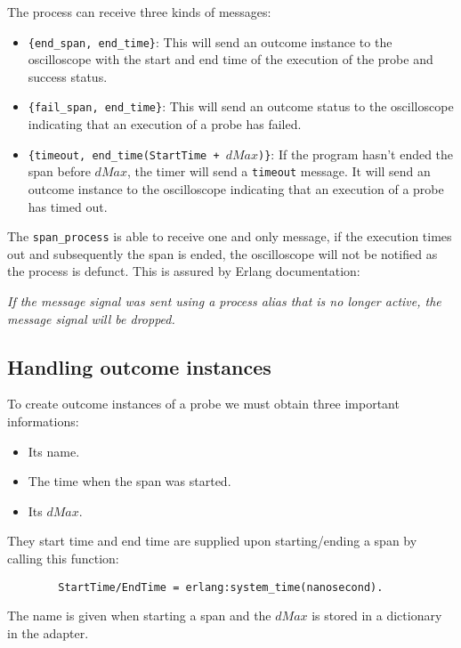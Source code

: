         The process can receive three kinds of messages:
        \begin{itemize}
            \item \texttt{\{end\_span, end\_time\}}: This will send an outcome instance to the oscilloscope with the start and end time of the execution of the probe and success status.
            \item \texttt{\{fail\_span, end\_time\}}: This will send an outcome status to the oscilloscope indicating that an execution of a probe has failed.
            \item \texttt{\{timeout, end\_time(StartTime + $dMax$)\}}: If the program hasn't ended the span before $dMax$, the timer will send a \texttt{timeout} message. It will send an outcome instance to the oscilloscope indicating that an execution of a probe has timed out.
        \end{itemize}
        The \texttt{span\_process} is able to receive one and only message, if the execution times out and subsequently the span is ended, the oscilloscope will not be notified as the process is defunct. This is assured by Erlang documentation:
        \begin{center}
            \textit{If the message signal was sent using a process alias that is no longer active, the message signal will be dropped.} \cite{erl-s}
        \end{center}

    \subsection{Handling outcome instances}
        To create outcome instances of a probe we must obtain three important informations:
        \begin{itemize}
            \item Its name.
            \item The time when the span was started.
            \item Its $dMax$.
        \end{itemize}
        
        They start time and end time are supplied upon starting/ending a span by calling this function:
        \begin{verbatim}
        StartTime/EndTime = erlang:system_time(nanosecond).
        \end{verbatim}
        The name is given when starting a span and the $dMax$ is stored in a dictionary in the adapter. 

